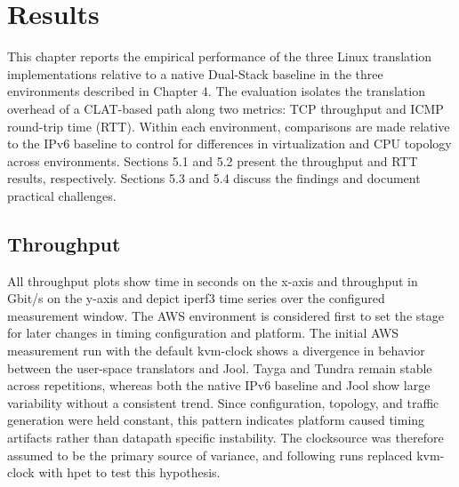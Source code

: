 \chapter{Results}
This chapter reports the empirical performance of the three Linux translation implementations relative to a native Dual-Stack baseline in the three environments described in Chapter 4. The evaluation isolates the translation overhead of a CLAT-based path along two metrics: TCP throughput and ICMP round-trip time (RTT). Within each environment, comparisons are made relative to the IPv6 baseline to control for differences in virtualization and CPU topology across environments. Sections 5.1 and 5.2 present the throughput and RTT results, respectively. Sections 5.3 and 5.4 discuss the findings and document practical challenges.

\section{Throughput}
All throughput plots show time in seconds on the x-axis and throughput in Gbit/s on the y-axis and depict iperf3 time series over the configured measurement window. The AWS environment is considered first to set the stage for later changes in timing configuration and platform.
The initial AWS measurement run with the default kvm-clock shows a divergence in behavior between the user-space translators and Jool. Tayga and Tundra remain stable across repetitions, whereas both the native IPv6 baseline and Jool show large variability without a consistent trend. Since configuration, topology, and traffic generation were held constant, this pattern indicates platform caused timing artifacts rather than datapath specific instability. The clocksource was therefore assumed to be the primary source of variance, and following runs replaced kvm-clock with hpet to test this hypothesis. 

